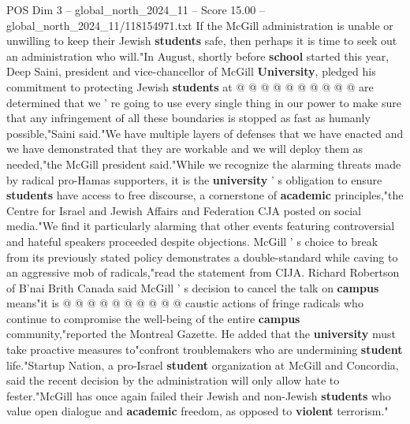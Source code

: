 \begin{textsample}{POS Dim 3 – global\_north\_2024\_11 – Score 15.00 – global\_north\_2024\_11/118154971.txt}
If the McGill administration is unable or unwilling to keep their Jewish \textbf{students} safe, then perhaps it is time to seek out an administration who will."In August, shortly before \textbf{school} started this year, Deep Saini, president and vice-chancellor of McGill \textbf{University}, pledged his commitment to protecting Jewish \textbf{students} at @ @ @ @ @ @ @ @ @ @ are determined that we ' re going to use every single thing in our power to make sure that any infringement of all these boundaries is stopped as fast as humanly possible,"Saini said."We have multiple layers of defenses that we have enacted and we have demonstrated that they are workable and we will deploy them as needed,"the McGill president said."While we recognize the alarming threats made by radical pro-Hamas supporters, it is the \textbf{university} ' s obligation to ensure \textbf{students} have access to free discourse, a cornerstone of \textbf{academic} principles,"the Centre for Israel and Jewish Affairs and Federation CJA posted on social media."We find it particularly alarming that other events featuring controversial and hateful speakers proceeded despite objections.
McGill ' s choice to break from its previously stated policy demonstrates a double-standard while caving to an aggressive mob of radicals,"read the statement from CIJA.
Richard Robertson of B'nai Brith Canada said McGill ' s decision to cancel the talk on \textbf{campus} means"it is @ @ @ @ @ @ @ @ @ @ caustic actions of fringe radicals who continue to compromise the well-being of the entire \textbf{campus} community,"reported the Montreal Gazette.
He added that the \textbf{university} must take proactive measures to"confront troublemakers who are undermining \textbf{student} life."Startup Nation, a pro-Israel \textbf{student} organization at McGill and Concordia, said the recent decision by the administration will only allow hate to fester."McGill has once again failed their Jewish and non-Jewish \textbf{students} who value open dialogue and \textbf{academic} freedom, as opposed to \textbf{violent} terrorism."

\end{textsample}
